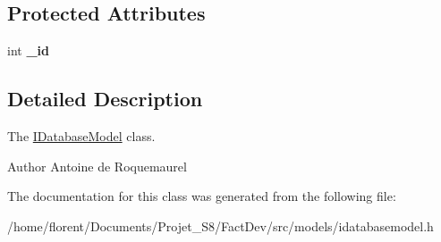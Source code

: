 \subsection*{Protected Attributes}
\begin{DoxyCompactItemize}
\item 
\hypertarget{classIDatabaseModel_a49f0ca7727c7d12eb78f670c882a3028}{int {\bfseries \-\_\-id}}\label{classIDatabaseModel_a49f0ca7727c7d12eb78f670c882a3028}

\end{DoxyCompactItemize}


\subsection{Detailed Description}
The \hyperlink{classIDatabaseModel}{I\-Database\-Model} class. 

\begin{DoxyAuthor}{Author}
Antoine de Roquemaurel 
\end{DoxyAuthor}


The documentation for this class was generated from the following file\-:\begin{DoxyCompactItemize}
\item 
/home/florent/\-Documents/\-Projet\-\_\-\-S8/\-Fact\-Dev/src/models/idatabasemodel.\-h\end{DoxyCompactItemize}
